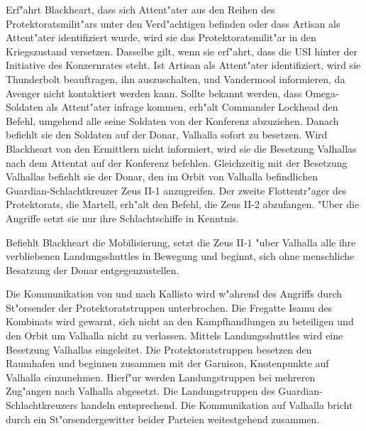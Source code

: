 
Erf"ahrt Blackheart, dass sich Attent"ater aus den Reihen des Protektoratsmilit"ars unter den Verd"achtigen befinden oder dass Artisan als Attent"ater identifiziert wurde, wird sie das Protektoratsmilit"ar in den Kriegszustand versetzen. Dasselbe gilt, wenn sie erf"ahrt, dass die USI hinter der Initiative des Konzernrates steht. Ist Artisan als Attent"ater identifiziert, wird sie Thunderbolt beauftragen, ihn auszuschalten, und Vandermool informieren, da Avenger nicht kontaktiert werden kann. Sollte bekannt werden, dass Omega-Soldaten als Attent"ater infrage kommen, erh"alt Commander Lockhead den Befehl, umgehend alle seine Soldaten von der Konferenz abzuziehen. Danach befiehlt sie den Soldaten auf der Donar, Valhalla sofort zu besetzen. Wird Blackheart von den Ermittlern nicht informiert, wird sie die Besetzung Valhallas nach dem Attentat auf der Konferenz befehlen. Gleichzeitig mit der Besetzung Valhallas befiehlt sie der Donar, den im Orbit von Valhalla befindlichen Guardian-Schlachtkreuzer Zeus II-1 anzugreifen. Der zweite Flottentr"ager des Protektorats, die Martell, erh"alt den Befehl, die Zeus II-2 abzufangen. "Uber die Angriffe setzt sie nur ihre Schlachtschiffe in Kenntnis.

Befiehlt Blackheart die Mobilisierung, setzt die Zeus II-1 "uber Valhalla alle ihre verbliebenen Landungsshuttles in Bewegung und beginnt, sich ohne menschliche Besatzung der Donar entgegenzustellen.

Die Kommunikation von und nach Kallisto wird w"ahrend des Angriffs durch St"orsender der Protektoratstruppen unterbrochen. Die Fregatte Isamu des Kombinats wird gewarnt, sich nicht an den Kampfhandlungen zu beteiligen und den Orbit um Valhalla nicht zu verlassen. Mittels Landungsshuttles wird eine Besetzung Valhallas eingeleitet. Die Protektoratstruppen besetzen den Raumhafen und beginnen zusammen mit der Garnison, Knotenpunkte auf Valhalla einzunehmen. Hierf"ur werden Landungstruppen bei mehreren Zug"angen nach Valhalla abgesetzt. Die Landungstruppen des Guardian-Schlachtkreuzers handeln entsprechend. Die Kommunikation auf Valhalla bricht durch ein St"orsendergewitter beider Parteien weitestgehend zusammen. 

